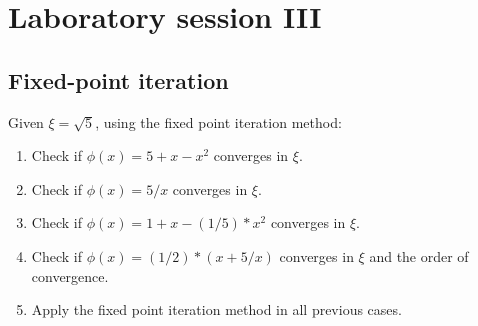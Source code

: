 \documentclass[12pt, a4paper]{report}
\newtheorem[style=M,bodystyle=\normalfont]{theorem}{Theorem}
\newtheorem[style=M,bodystyle=\normalfont]{corollary}{Corollary}
\newtheorem[style=M,bodystyle=\normalfont]{lemma}{Lemma}
\newtheorem[style=M,bodystyle=\normalfont]{definition}{Definition}
\begin{document}
\newpage

\chapter{Laboratory session III}
    \section{Fixed-point iteration}
        Given $\xi=\sqrt{5}$, using the fixed point iteration method: 
        \begin{enumerate}
            \item Check if $\phi(x)=5+x-x^2$ converges in $\xi$.
            \item Check if $\phi(x)=5/x$ converges in $\xi$.
            \item Check if $\phi(x)=1+x-(1/5)*x^2$ converges in $\xi$.
            \item Check if $\phi(x)=(1/2)*(x + 5/x)$ converges in $\xi$ and the order of convergence. 
            \item Apply the fixed point iteration method in all previous cases. 
        \end{enumerate}
\end{document}

